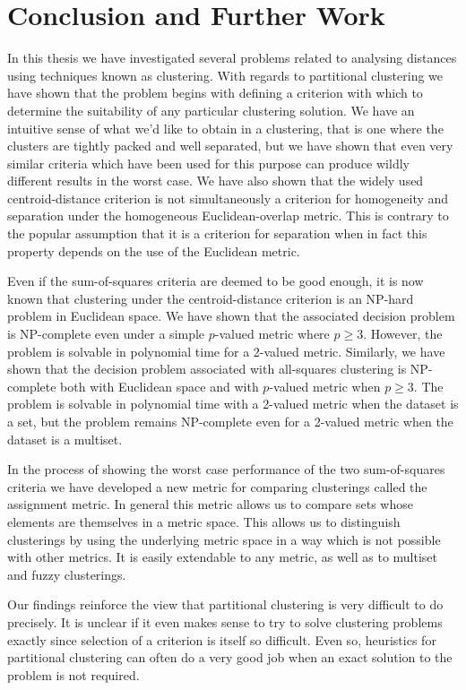 \chapter{Conclusion and Further Work}
\label{cha:conclusion}

In this thesis we have investigated several problems related to analysing
distances using techniques known as clustering.  With regards to partitional
clustering we have shown that the problem begins with defining a criterion
with which to determine the suitability of any particular clustering
solution.  We have an intuitive sense of what we'd like to obtain in a
clustering, that is one where the clusters are tightly packed and well
separated, but we have shown that even very similar criteria which have been
used for this purpose can produce wildly different results in the worst case.
We have also shown that the widely used centroid-distance criterion is not
simultaneously a criterion for homogeneity and separation under the
homogeneous Euclidean-overlap metric.  This is contrary to the popular
assumption that it is a criterion for separation when in fact this property
depends on the use of the Euclidean metric.

Even if the sum-of-squares criteria are deemed to be good enough, it is now
known that clustering under the centroid-distance criterion is an NP-hard
problem in Euclidean space.  We have shown that the associated decision
problem is NP-complete even under a simple $p$-valued metric where $p \geq 3$.
However, the problem is solvable in polynomial time for a 2-valued metric.
Similarly, we have shown that the decision problem associated with all-squares
clustering is NP-complete both with Euclidean space and with $p$-valued
metric when $p \geq 3$.  The problem is solvable in polynomial time with a
2-valued metric when the dataset is a set, but the problem remains NP-complete
even for a 2-valued metric when the dataset is a multiset.

In the process of showing the worst case performance of the two sum-of-squares
criteria we have developed a new metric for comparing clusterings called the
assignment metric.  In general this metric allows us to compare sets whose
elements are themselves in a metric space.  This allows us to distinguish
clusterings by using the underlying metric space in a way which is not
possible with other metrics.  It is easily extendable to any metric, as well
as to multiset and fuzzy clusterings.

Our findings reinforce the view that partitional clustering is very difficult
to do precisely.  It is unclear if it even makes sense to try to solve
clustering problems exactly since selection of a criterion is itself so
difficult.  Even so, heuristics for partitional clustering can often do a very
good job when an exact solution to the problem is not required.

